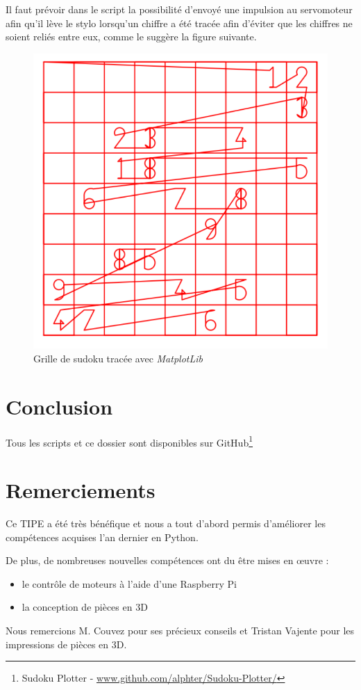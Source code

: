 \documentclass[12pt,a4paper]{report}
\begin{document}
Il faut prévoir dans le script la possibilité d'envoyé une impulsion au servomoteur afin qu'il lève le stylo lorsqu'un chiffre a été tracée afin d'éviter que les chiffres ne soient reliés entre eux, comme le suggère la figure suivante.

\begin{figure}[!h]
 \center
 \includegraphics[scale=0.5]{../pictures/Sudoku_relies}
 \caption{Grille de sudoku tracée avec \emph{MatplotLib}}
\end{figure}

\chapter*{Conclusion}
Tous les scripts et ce dossier sont disponibles sur GitHub\footnote{Sudoku Plotter - \url{www.github.com/alphter/Sudoku-Plotter/}}

\chapter*{Remerciements}
Ce TIPE a été très bénéfique et nous a tout d'abord permis d'améliorer les compétences acquises l'an dernier en Python.

De plus, de nombreuses nouvelles compétences ont du être mises en œuvre :

\begin{itemize}[label=--]
\item le contrôle de moteurs à l'aide d'une Raspberry Pi
\item la conception de pièces en 3D

\end{itemize}

Nous remercions M. Couvez pour ses précieux conseils et Tristan Vajente pour les impressions de pièces en 3D.


\end{document}
